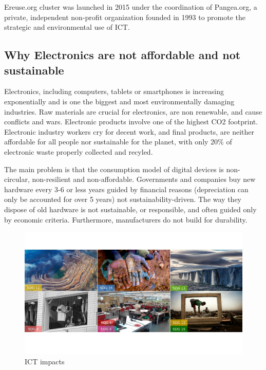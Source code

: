 \documentclass[
]{book}
\begin{document}
Ereuse.org cluster was launched in 2015 under the coordination of Pangea.org, a private, independent non-profit organization founded in 1993 to promote the strategic and environmental use of ICT.

\hypertarget{why-electronics-are-not-affordable-and-not-sustainable}{%
\subsection{Why Electronics are not affordable and not sustainable}\label{why-electronics-are-not-affordable-and-not-sustainable}}

Electronics, including computers, tablets or smartphones is increasing exponentially and is one the biggest and most environmentally damaging industries. Raw materials are crucial for electronics, are non renewable, and cause conflicts and wars. Electronic products involve one of the highest CO2 footprint. Electronic industry workers cry for decent work, and final products, are neither affordable for all people nor sustainable for the planet, with only 20\% of electronic waste properly collected and recyled.

The main problem is that the consumption model of digital devices is non-circular, non-resilient and non-affordable. Governments and companies buy new hardware every 3-6 or less years guided by financial reasons (depreciation can only be accounted for over 5 years) not sustainability-driven. The way they dispose of old hardware is not sustainable, or responsible, and often guided only by economic criteria. Furthermore, manufacturers do not build for durability.

\begin{figure}

{\centering \includegraphics[width=1\linewidth]{./figs/25} 

}

\caption{ICT impacts}\label{fig:figimpacts}
\end{figure}
\end{document}
